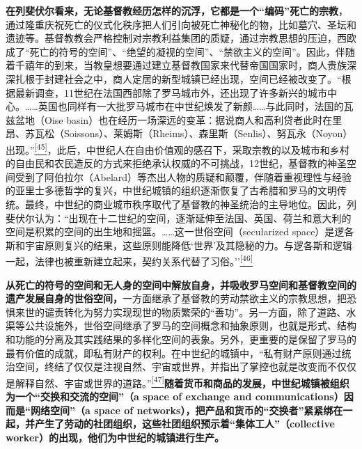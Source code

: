 \documentclass[UTF8, fontset = sourcesans, a4paper, oneside, zihao =
-4, scheme=chinese, no-math, space=true]{ctexbook}
\begin{document}
\textbf{在列斐伏尔看来，无论基督教经历怎样的沉浮，它都是一个``编码''死亡的宗教}，通过隆重庆祝死亡的仪式化秩序把人们引向被死亡神秘化的物，比如墓穴、圣坛和遗迹等。基督教教会严格控制对宗教利益集团的质疑，通过宗教思想的压迫，西欧成了``死亡的符号的空间''、``绝望的凝视的空间''、``禁欲主义的空间''。因此，伴随着千禧年的到来，当教皇想要通过建立基督教国家来代替帝国国家时，商人贵族深深扎根于封建社会之中，商人定居的新型城镇已经出现，空间已经被改变了。``根据最新调查，11世纪在法国西部除了罗马城市外，还出现了许多新兴的城市中心。……英国也同样有一大批罗马城市在中世纪焕发了新颜……与此同时，法国的瓦兹盆地（Oise
basin）也在经历一场深远的变革：据说商人和高利贷者此时在里昂、苏瓦松（Soissons）、莱姆斯（Rheims）、森里斯（Senlis）、努瓦永（Noyon）出现。''\protect\hypertarget{part0006_split_003.htmlux5cux23w45}{}{}\protect\hyperlink{part0006_split_003.htmlux5cux23m45}{\textsuperscript{{[}45{]}}}，此后，中世纪人在自由价值观的感召下，采取宗教的以及城市和乡村的自由民和农民造反的方式来拒绝承认权威的不可挑战，12世纪，基督教的神圣空间受到了阿伯拉尔（Abelard）等杰出人物的质疑和颠覆，伴随着重视理性与经验的亚里士多德哲学的复兴，中世纪城镇的组织逐渐恢复了古希腊和罗马的文明传统。最终，中世纪的商业城市秩序取代了基督教的神圣统治的主导地位。因此，列斐伏尔认为：``出现在十二世纪的空间，逐渐延伸至法国、英国、荷兰和意大利的空间是积累的空间的出生地和摇篮。……这一世俗空间（secularized
space）是逻各斯和宇宙原则复兴的结果，这些原则能降低`世界'及其隐秘的力。与逻各斯和逻辑一起，法律也被重新建立起来，契约关系代替了习俗。''\protect\hypertarget{part0006_split_003.htmlux5cux23w46}{}{}\protect\hyperlink{part0006_split_003.htmlux5cux23m46}{\textsuperscript{{[}46{]}}}

\textbf{从死亡的符号的空间和无人身的空间中解放自身，并吸收罗马空间和基督教空间的遗产发展自身的世俗空间，}一方面继承了基督教的劳动禁欲主义的宗教思想，把恐惧来世的谴责转化为努力实现现世的物质繁荣的``善功''。另一方面，除了道路、水渠等公共设施外，世俗空间继承了罗马的空间概念和抽象原则，也就是形式、结构和功能的分离及其实践结果的多样化空间的表象。另外，更重要的是保留了罗马的最有价值的成就，即私有财产的权利。在中世纪的城镇中，``私有财产原则通过统治空间，终结了仅仅是注视自然、宇宙或世界，并指出了掌控也就是改变而不仅仅是解释自然、宇宙或世界的道路。''\protect\hypertarget{part0006_split_003.htmlux5cux23w47}{}{}\protect\hyperlink{part0006_split_003.htmlux5cux23m47}{\textsuperscript{{[}47{]}}}\textbf{随着货币和商品的发展，中世纪城镇被组织为一个``交换和交流的空间''（a
space of exchange and communications）因而是``网络空间''（a space of
networks），把产品和货币的``交换者''紧紧绑在一起，并产生了劳动的社团组织，这些社团组织预示着``集体工人''（collective
worker）的出现，他们为中世纪的城镇进行生产。}
\end{document}
